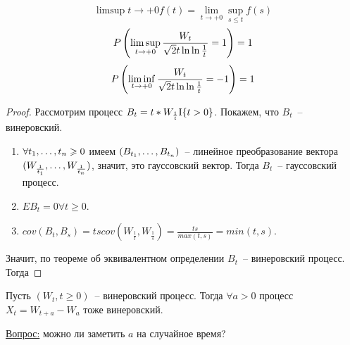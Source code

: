\begin{corollary}
$$\limsup{t \to +0} f(t) = \lim_{t \to +0} \sup_{s \leq t} f(s)$$
$$P \left( \limsup_{t \to +0} \frac{W_t}{\sqrt 2t \ln \ln \frac{1}{t}} = 1 \right) = 1$$
$$P \left( \liminf_{t \to +0} \frac{W_t}{\sqrt 2t \ln \ln \frac{1}{t}} = -1 \right) = 1$$
\end{corollary}
\begin{proof}
Рассмотрим процесс $B_t = t*W_{\frac{1}{t}} \mathrm{I}\{ t>0 \}$. Покажем, что $B_t$~-- винеровский.

\begin{enumerate}
\item $\forall t_{1}, \dots, t_{n} \geqslant 0$ имеем $(B_{t_1}, \dots, B_{t_n})$~-- линейное преобразование вектора
$(W_{\frac{1}{t_1}}, \dots, W_{\frac{1}{t_n}})$, значит, это гауссовский вектор. Тогда $B_t$~--
гауссовский процесс.

\item $EB_t = 0 \forall t \geq 0$.

\item $cov(B_t, B_s) = t s cov(W_\frac{1}{t}, W_\frac{1}{s}) = \frac{ts}{max(t,s)} = min(t, s)$.
\end{enumerate}

Значит, по теореме об эквивалентном определении $B_t$~-- винеровский процесс. Тогда
\end{proof}

\begin{theorem}
Пусть $(W_t, t \geq 0)$~-- винеровский процесс. Тогда $\forall a > 0$ процесс
$X_t = W_{t+a} - W_a$ тоже винеровский.

\underline{Вопрос:} можно ли заметить $a$ на случайное время?
\end{theorem}